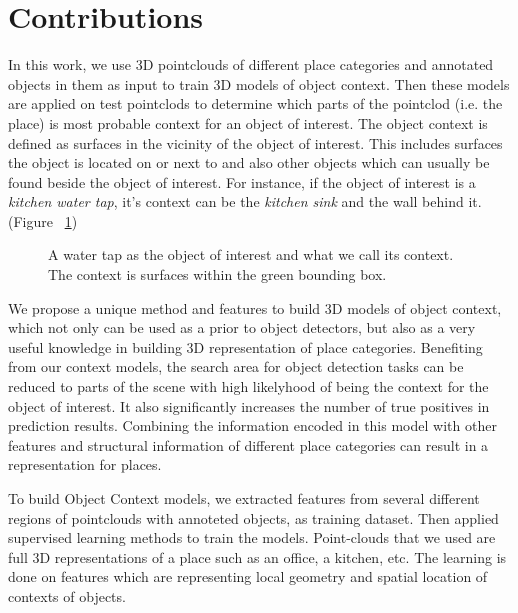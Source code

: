 \section {Contributions}
\label{Contributions.sec}
In this work, we use 3D pointclouds of different place categories and annotated objects in them as input to train 3D models of object context. Then these models are applied on test pointclods to determine which parts of the pointclod (i.e. the place) is most probable context for an object of interest. The object context is defined as surfaces in the vicinity of the object of interest. This includes surfaces the object is located on or next to and also other objects which can usually be found beside the object of interest. 
For instance, if the object of interest is a \textit{kitchen water tap}, it's context can be the 
\textit{kitchen sink} and the wall behind it. (Figure ~\ref{contextExample.figure})

\begin{figure}[t]
  \caption[Illustration of a sample Context.]
  {A water tap as the object of interest and what we call its context. The context is surfaces within the green 
  bounding box.}
  \label{contextExample.figure}
\end{figure}

We propose a unique method and features to build 3D models of object context, which not only can be used as a prior to 
object detectors, but also as a very useful knowledge in building 3D representation of place categories. 
Benefiting from our context models, the search area for object detection tasks can be reduced to parts of the scene with high 
likelyhood of being the context for the object of interest. 
It also significantly increases the number of true positives in prediction results. 
Combining the information encoded in this model with other features and structural information of different place categories can 
result in a representation for places.
 
 To build Object Context models, we extracted features from several different regions of pointclouds with annoteted objects, as training dataset. Then applied supervised learning methods to train the models. Point-clouds that we used are full 3D representations of a place such as an office, a kitchen, etc. 
 The learning is done on features which are representing local geometry and spatial location of contexts of objects.
 
